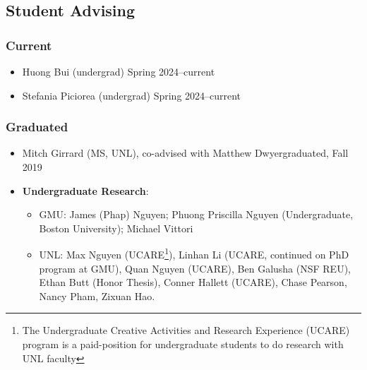 \documentclass[11pt]{article}
\begin{document}
    {
      \subsection{Student Advising}

      \subsubsection{Current}
      \begin{itemize}
              \nguyenkhoi{}
              \haiduong{}
              \linhan{}
              \didier{}
        \item Huong Bui (undergrad) \hfill Spring 2024--current
        \item Stefania Piciorea (undergrad) \hfill Spring 2024--current
      \end{itemize}

      \subsubsection{Graduated}
      \begin{itemize}
              \kimhao{}
              \guolong{}
              \alex{}
        \item Mitch Girrard (MS, UNL), co-advised with Matthew Dwyer\hfill graduated, Fall 2019

        \item \textbf{Undergraduate Research}:
              \begin{itemize}
                \item GMU: James (Phap) Nguyen; Phuong Priscilla Nguyen (Undergraduate, Boston University); Michael Vittori
                \item UNL: Max Nguyen (UCARE\footnote{The Undergraduate Creative Activities and Research Experience (UCARE) program is a paid-position for undergraduate students to do research with UNL faculty}), Linhan Li (UCARE, continued on PhD program at GMU), Quan Nguyen (UCARE), Ben Galusha (NSF REU), Ethan Butt (Honor Thesis), Conner Hallett (UCARE), Chase Pearson, Nancy Pham, Zixuan Hao.
              \end{itemize}
      \end{itemize}
    }
\end{document}
